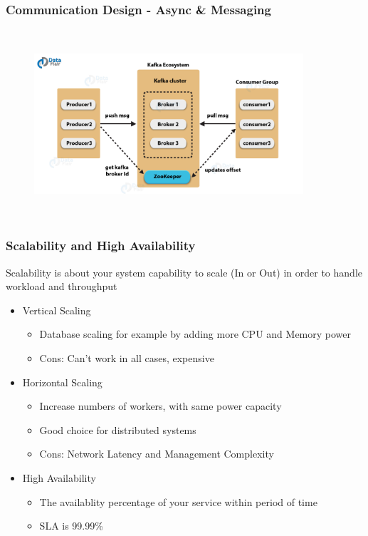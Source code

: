 \documentclass{beamer}
\begin{document}
	\begin{frame}
		\frametitle{Communication Design - Async \& Messaging}
		
		\begin{figure}[h]
			\includegraphics[width=100mm,height= 70mm, scale=1]{img/kafka-architecture.png}
		\end{figure}
		\vspace{100mm}
	\end{frame}

	
	\begin{frame}
		\frametitle{Scalability and High Availability}
		Scalability is about your system capability to scale (In or Out) in order to handle workload and throughput
		\begin{itemize}
			\item<2-> Vertical Scaling
				\begin{itemize} 
					\item<3-> \scriptsize{Database scaling for example by adding more CPU and Memory power} 
					\item<4-> \scriptsize{Cons: \alert {Can't work in all cases, expensive} }
				\end{itemize}
			\item<5-> Horizontal Scaling
				\begin{itemize} 
					\item<6-> \scriptsize{Increase numbers of workers, with same power capacity} 
					\item<7-> \scriptsize{Good choice for distributed systems}
					\item<8-> \scriptsize{Cons: \alert {Network Latency and Management Complexity} }
				\end{itemize}
		
			\item<9-> High Availability
			\begin{itemize} 
				\item<10-> \scriptsize{The availablity percentage of your service within period of time} 
				\item<11-> \scriptsize{SLA is 99.99\%}
			\end{itemize}
		
		\end{itemize}
		\vspace{100mm}
	\end{frame}
\end{document}
